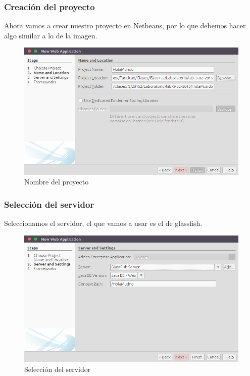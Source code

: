 \documentclass{beamer}
\begin{document}
\begin{frame}
  \frametitle{Creación del proyecto}
  Ahora vamos a crear nuestro proyecto en Netbeans, por lo que debemos hacer
  algo similar a lo de la imagen.
  \begin{figure}[ht]
    \centering
    \includegraphics[scale=0.25]{figures/holamundo.png}
    \caption{\label{fig:HolaMundo} Nombre del proyecto}
  \end{figure}

\end{frame}


\begin{frame}
  \frametitle{Selección del servidor}
  Seleccionamos el servidor, el que vamos a usar es el de glassfish.
  \begin{figure}[ht]
    \centering
    \includegraphics[scale=0.25]{figures/serversettings.png}
    \caption{\label{fig:serversettings} Selección del servidor}
  \end{figure}

\end{frame}
\end{document}
